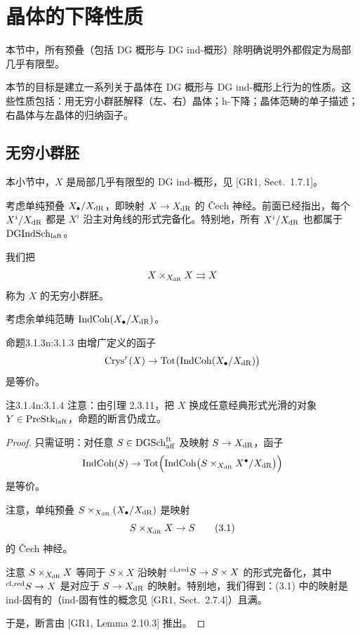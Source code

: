 \chapter{晶体的下降性质}

本节中，所有预叠（包括 DG 概形与 DG ind-概形）除明确说明外都假定为局部几乎有限型。

本节的目标是建立一系列关于晶体在 DG 概形与 DG ind-概形上行为的性质。这些性质包括：用无穷小群胚解释（左、右）晶体；h-下降；晶体范畴的单子描述；右晶体与左晶体的归纳函子。

\section{无穷小群胚}

本小节中，$X$ 是局部几乎有限型的 DG ind-概形，见 [GR1, Sect.~1.7.1]。

考虑单纯预叠 $X_\bullet/X_{\mathrm{dR}}$，即映射 $X\to X_{\mathrm{dR}}$ 的 Čech 神经。前面已经指出，每个 $X^i/X_{\mathrm{dR}}$ 都是 $X^i$ 沿主对角线的形式完备化。特别地，所有 $X^i/X_{\mathrm{dR}}$ 也都属于 $\mathrm{DGIndSch}_{\mathrm{laft}}$。

我们把
\[
X\times_{X_{\mathrm{dR}}}X\rightrightarrows X
\]
称为 $X$ 的无穷小群胚。

考虑余单纯范畴 $\mathrm{IndCoh}(X_\bullet/X_{\mathrm{dR}})$。

\begin{othm}{命题}{3.1.3}{n:3.1.3}
由增广定义的函子
\[
\mathrm{Crys}^r(X)\to\mathrm{Tot}\big(\mathrm{IndCoh}(X_\bullet/X_{\mathrm{dR}})\big)
\]
是等价。
\end{othm}

\begin{othm}{注}{3.1.4}{n:3.1.4}
注意：由引理 2.3.11，把 $X$ 换成任意经典形式光滑的对象 $Y\in\mathrm{PreStk}_{\mathrm{laft}}$，命题的断言仍成立。
\end{othm}

\begin{proof}
只需证明：对任意 $S\in\mathrm{DGSch}_{\mathrm{aff}}^{\mathrm{ft}}$ 及映射 $S\to X_{\mathrm{dR}}$，函子
\[
\mathrm{IndCoh}(S)\to\mathrm{Tot}\Big(\mathrm{IndCoh}\big(S\times_{X_{\mathrm{dR}}}X^\bullet/X_{\mathrm{dR}}\big)\Big)
\]
是等价。

注意，单纯预叠 $S\times_{X_{\mathrm{dR}}}(X_\bullet/X_{\mathrm{dR}})$ 是映射
\begin{equation}
S\times_{X_{\mathrm{dR}}}X\to S\tag{3.1}
\end{equation}
的 Čech 神经。

注意 $S\times_{X_{\mathrm{dR}}}X$ 等同于 $S\times X$ 沿映射 $^{\mathrm{cl,red}} S\to S\times X$ 的形式完备化，其中 $^{\mathrm{cl,red}} S\to X$ 是对应于 $S\to X_{\mathrm{dR}}$ 的映射。特别地，我们得到：(3.1) 中的映射是 ind-固有的（ind-固有性的概念见 [GR1, Sect.~2.7.4]）且满。

于是，断言由 [GR1, Lemma 2.10.3] 推出。
\end{proof}

